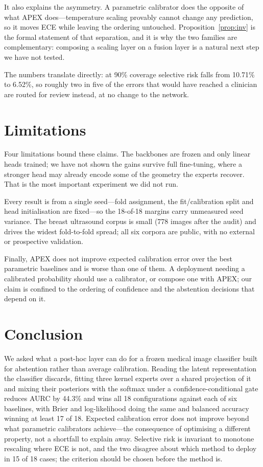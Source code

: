 \documentclass[conference]{IEEEtran}
\begin{document}
It also explains the asymmetry. A parametric calibrator does the opposite of what
APEX does---temperature scaling provably cannot change any prediction, so it moves
ECE while leaving the ordering untouched. Proposition~\ref{prop:inv} is the formal
statement of that separation, and it is why the two families are complementary:
composing a scaling layer on a fusion layer is a natural next step we have not
tested.

The numbers translate directly: at 90\% coverage selective risk falls from 10.71\%
to 6.52\%, so roughly two in five of the errors that would have reached a clinician
are routed for review instead, at no change to the network.

\section{Limitations}
\label{sec:limits}
Four limitations bound these claims. The backbones are frozen and only linear heads
trained; we have not shown the gains survive full fine-tuning, where a stronger
head may already encode some of the geometry the experts recover. That is the most
important experiment we did not run.

Every result is from a single seed---fold assignment, the fit/calibration split
and head initialisation are fixed---so the 18-of-18 margins carry unmeasured seed
variance. The breast ultrasound corpus is small (778 images after the audit) and
drives the widest fold-to-fold spread; all six corpora are public, with no
external or prospective validation.

Finally, APEX does not improve expected calibration error over the best parametric
baselines and is worse than one of them. A deployment needing a calibrated
probability should use a calibrator, or compose one with APEX; our claim is
confined to the ordering of confidence and the abstention decisions that depend on
it.

\section{Conclusion}

We asked what a post-hoc layer can do for a frozen medical image classifier built
for abstention rather than average calibration. Reading the latent representation
the classifier discards, fitting three kernel experts over a shared projection of
it and mixing their posteriors with the softmax under a confidence-conditional
gate reduces AURC by 44.3\% and wins all 18 configurations against each of six
baselines, with Brier and log-likelihood doing the same and balanced accuracy
winning at least 17 of 18. Expected calibration error does not improve beyond what
parametric calibrators achieve---the consequence of optimising a different
property, not a shortfall to explain away. Selective risk is invariant to monotone
rescaling where ECE is not, and the two disagree about which method to deploy in
15 of 18 cases; the criterion should be chosen before the method is.



\end{document}
